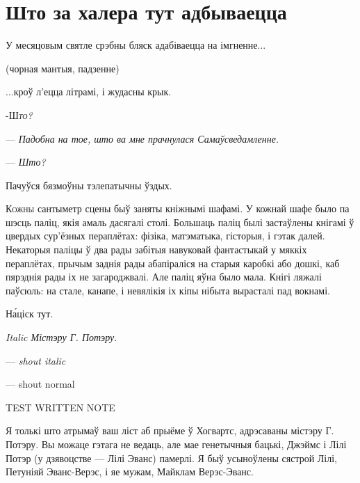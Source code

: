 \chapter{Што за халера тут адбываецца}

\begin{chapterOpeningQuote}
    \noindent
    У месяцовым святле срэбны бляск адабіваецца на імгненне...
    
    \vspace*{2ex}
    (чорная мантыя, падзенне)
    
    \vspace*{2ex}
    ...кроў л'ецца літрамі, і жудасны крык.
\end{chapterOpeningQuote}



\lettrine[lines=1,lraise=-0.1]{-Ш}{\emph{то?}}{}



--- \emph{Падобна на тое, што ва мне прачнулася Самаўсведамленне.}

--- \emph{Што?}

Пачуўся бязмоўны тэлепатычны ўздых.


\lettrine{К}{ожны} сантыметр сцены быў заняты кніжнымі шафамі.
У кожнай шафе было па шэсць паліц, якія амаль дасягалі столі.
Большаць паліц былі застаўлены кнігамі ў цвердых сур'ёзных пераплётах: фізіка, матэматыка, гісторыя,
і гэтак далей. Некаторыя паліцы ў два рады забітыя навуковай фантастыкай у мяккіх пераплётах, прычым 
заднія рады абапіраліся на старыя каробкі або дошкі, каб пярэднія рады іх не загароджвалі.
Але паліц яўна было мала. Кнігі ляжалі паўсюль: на стале, канапе, і невялікія іх кіпы нібыта вырасталі 
пад вокнамі. 


Н\'аціск тут.

\emph{Italic Містэру Г. Потэру}.


--- \emph{shout italic }

--- shout normal 

TEST WRITTEN NOTE



\begin{writtenNote}

    Я толькі што атрымаў ваш ліст аб прыёме ў Хогвартс, адрэсаваны містэру Г. Потэру. Вы можаце
гэтага не ведаць, але мае генетычныя бацькі, Джэймс і Лілі Потэр (у дзявоцстве --- Лілі Эванс)
памерлі. Я быў усыноўлены сястрой Лілі, Петуніяй Эванс-Верэс, і яе мужам, Майклам Верэс-Эванс.


\end{writtenNote}


